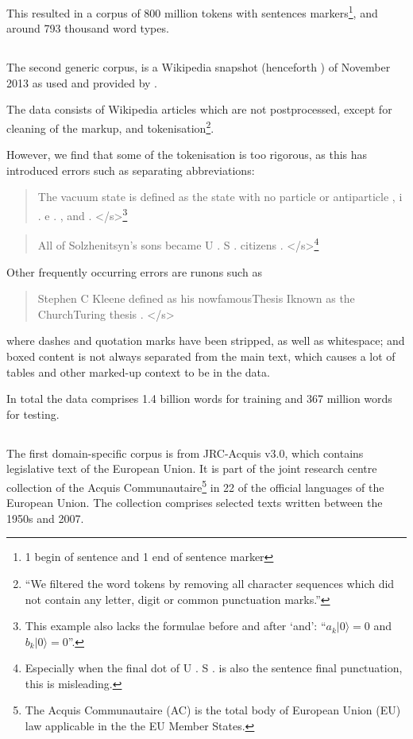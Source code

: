  This resulted in a corpus of 800 million tokens with sentences markers\footnote{1 begin of sentence and 1 end of sentence marker}, and around 793 thousand word types.
  
 \subsection{\wp}
  The second generic corpus, is a Wikipedia snapshot (henceforth \wp) of November 2013 as used and provided by \textcite{pickhardt2014generalized}. 
  
  The data consists of Wikipedia articles which are not postprocessed, except for cleaning of the markup, and tokenisation\footnote{``We filtered the word tokens by removing all character sequences which did not contain any letter, digit or common punctuation marks.''}.
  
  However, we find that some of the tokenisation is too rigorous, as this has introduced errors such as separating abbreviations:
  
  \begin{quote}The vacuum state is defined as the state with no particle or antiparticle , i . e . , and . </s>\footnote{This example also lacks the formulae before and after `and': ``$a_k |0\rangle=0$ and $b_k |0\rangle=0$''.}\end{quote}
  
  \begin{quote}All of Solzhenitsyn's sons became U . S . citizens . </s>\footnote{Especially when the final dot of U . S . is also the sentence final punctuation, this is misleading.}\end{quote}
  Other frequently occurring errors are runons such as 
  
  \begin{quote}Stephen C Kleene defined as his nowfamousThesis Iknown as the ChurchTuring thesis . </s>\end{quote}
  where dashes and quotation marks have been stripped, as well as whitespace; and boxed content is not always separated from the main text, which causes a lot of tables and other marked-up context to be in the data.
  
  In total the data comprises 1.4 billion words for training and 367 million words for testing.

   \subsection{\jrc}
  The first domain-specific corpus is from JRC-Acquis v3.0\cite{steinberger2006jrc}, which contains legislative text of the European Union. It is part of the joint research centre collection of the Acquis Communautaire\footnote{The Acquis Communautaire (AC) is the total body of European Union (EU) law applicable in the the EU Member States.} in 22 of the official languages of the European Union. The collection comprises selected texts written between the 1950s and 2007.
  

